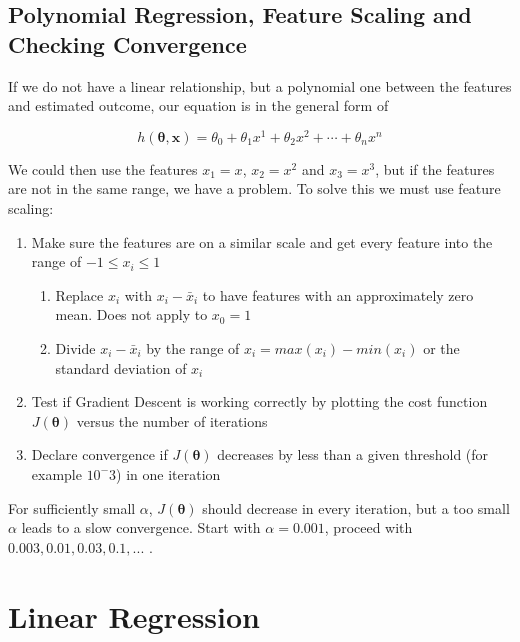 \documentclass[11pt]{article}
\begin{document}
\subsection{Polynomial Regression, Feature Scaling and Checking Convergence}

If we do not have a linear relationship, but a polynomial one between the features and estimated outcome, our equation is in the general form of

\begin{equation}
    h(\bm{\theta},\bm{x}) = \theta_0 + \theta_1 x^1 + \theta_2 x^2 + \cdots + \theta_n x^n
\end{equation}

We could then use the features $x_1 = x$, $x_2 = x^2$ and $x_3 = x^3$, but if the features are not in the same range, we have a problem. To solve this we must use feature scaling:

\begin{enumerate}
    \item Make sure the features are on a similar scale and get every feature into the range of $-1\leq x_i \leq 1$
          \begin{enumerate}
              \item Replace $x_i$ with $x_i - \bar{x}_i$ to have features with an approximately zero mean. Does not apply to $x_0 = 1$
              \item Divide $x_i - \bar{x}_i$ by the range of $x_i = max(x_i) - min(x_i)$ or the standard deviation of $x_i$
          \end{enumerate}
    \item Test if Gradient Descent is working correctly by plotting the cost function $J(\bm{\theta})$ versus the number of iterations
    \item Declare convergence if $J(\bm{\theta})$ decreases by less than a given threshold (for example $10^-3$) in one iteration
\end{enumerate}

For sufficiently small $\alpha$, $J(\bm{\theta})$ should decrease in every iteration, but a too small $\alpha$ leads to a slow convergence. Start with $\alpha = 0.001$, proceed with $0.003, 0.01, 0.03, 0.1, ...$ .

\newpage

\section{Linear Regression}
\end{document}
